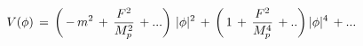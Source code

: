 \begin{equation}
\label{vpf}
V(\phi) \, = \, \left (\,-\, m^2 \, + \, {F^2 \over M_p^2} \, + ...\right )\, 
|\phi|^2\, + \, 
\left ( \, 1\, + \, {F^2 \over M_p^4}\, +.. \right ) |\phi|^4 \, +...
\end{equation} 
